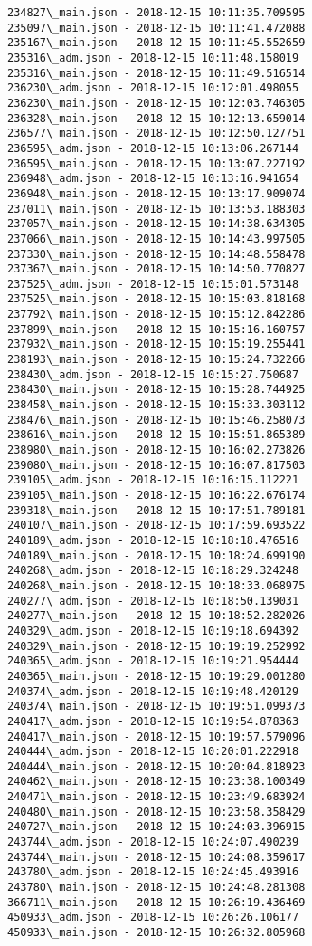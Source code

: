\documentclass[11pt]{article}
\begin{document}
\begin{Verbatim}[commandchars=\\\{\}]
234827\_main.json - 2018-12-15 10:11:35.709595
235097\_main.json - 2018-12-15 10:11:41.472088
235167\_main.json - 2018-12-15 10:11:45.552659
235316\_adm.json - 2018-12-15 10:11:48.158019
235316\_main.json - 2018-12-15 10:11:49.516514
236230\_adm.json - 2018-12-15 10:12:01.498055
236230\_main.json - 2018-12-15 10:12:03.746305
236328\_main.json - 2018-12-15 10:12:13.659014
236577\_main.json - 2018-12-15 10:12:50.127751
236595\_adm.json - 2018-12-15 10:13:06.267144
236595\_main.json - 2018-12-15 10:13:07.227192
236948\_adm.json - 2018-12-15 10:13:16.941654
236948\_main.json - 2018-12-15 10:13:17.909074
237011\_main.json - 2018-12-15 10:13:53.188303
237057\_main.json - 2018-12-15 10:14:38.634305
237066\_main.json - 2018-12-15 10:14:43.997505
237330\_main.json - 2018-12-15 10:14:48.558478
237367\_main.json - 2018-12-15 10:14:50.770827
237525\_adm.json - 2018-12-15 10:15:01.573148
237525\_main.json - 2018-12-15 10:15:03.818168
237792\_main.json - 2018-12-15 10:15:12.842286
237899\_main.json - 2018-12-15 10:15:16.160757
237932\_main.json - 2018-12-15 10:15:19.255441
238193\_main.json - 2018-12-15 10:15:24.732266
238430\_adm.json - 2018-12-15 10:15:27.750687
238430\_main.json - 2018-12-15 10:15:28.744925
238458\_main.json - 2018-12-15 10:15:33.303112
238476\_main.json - 2018-12-15 10:15:46.258073
238616\_main.json - 2018-12-15 10:15:51.865389
238980\_main.json - 2018-12-15 10:16:02.273826
239080\_main.json - 2018-12-15 10:16:07.817503
239105\_adm.json - 2018-12-15 10:16:15.112221
239105\_main.json - 2018-12-15 10:16:22.676174
239318\_main.json - 2018-12-15 10:17:51.789181
240107\_main.json - 2018-12-15 10:17:59.693522
240189\_adm.json - 2018-12-15 10:18:18.476516
240189\_main.json - 2018-12-15 10:18:24.699190
240268\_adm.json - 2018-12-15 10:18:29.324248
240268\_main.json - 2018-12-15 10:18:33.068975
240277\_adm.json - 2018-12-15 10:18:50.139031
240277\_main.json - 2018-12-15 10:18:52.282026
240329\_adm.json - 2018-12-15 10:19:18.694392
240329\_main.json - 2018-12-15 10:19:19.252992
240365\_adm.json - 2018-12-15 10:19:21.954444
240365\_main.json - 2018-12-15 10:19:29.001280
240374\_adm.json - 2018-12-15 10:19:48.420129
240374\_main.json - 2018-12-15 10:19:51.099373
240417\_adm.json - 2018-12-15 10:19:54.878363
240417\_main.json - 2018-12-15 10:19:57.579096
240444\_adm.json - 2018-12-15 10:20:01.222918
240444\_main.json - 2018-12-15 10:20:04.818923
240462\_main.json - 2018-12-15 10:23:38.100349
240471\_main.json - 2018-12-15 10:23:49.683924
240480\_main.json - 2018-12-15 10:23:58.358429
240727\_main.json - 2018-12-15 10:24:03.396915
243744\_adm.json - 2018-12-15 10:24:07.490239
243744\_main.json - 2018-12-15 10:24:08.359617
243780\_adm.json - 2018-12-15 10:24:45.493916
243780\_main.json - 2018-12-15 10:24:48.281308
366711\_main.json - 2018-12-15 10:26:19.436469
450933\_adm.json - 2018-12-15 10:26:26.106177
450933\_main.json - 2018-12-15 10:26:32.805968

    \end{Verbatim}
\end{document}
